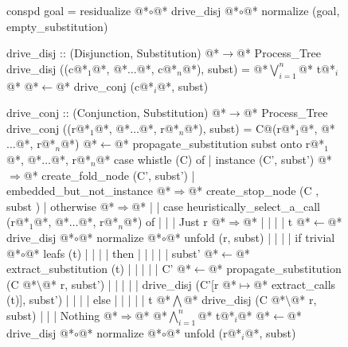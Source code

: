 \documentclass[12pt,a4paper]{report}
\begin{document}
\thispagestyle{empty}
\begin{figure}[h]
\begin{PseudoCode}[moredelim={[is][stringstyle]{@@}{@@}},
  moredelim={[is][\color{dkgreen}\bfseries]{@!}{@!}},
  moredelim={[is][\color{red}\bfseries]{!!}{!!}}]
conspd goal = residualize @*$\circ$@* drive_disj @*$\circ$@* normalize (goal, empty_substitution)

drive_disj :: (Disjunction, Substitution) @*$\to$@* Process_Tree
drive_disj ((c@*$_1$@*, @*$\dots$@*, c@*$_n$@*), subst) = @*$\bigvee_{i=1}^n$@* t@*$_i$@* @*$\leftarrow$@* drive_conj (c@*$_i$@*, subst)

drive_conj :: (Conjunction, Substitution) @*$\to$@* Process_Tree
drive_conj ((r@*$_1$@*, @*$\dots$@*, r@*$_n$@*), subst) =
  C@(r@*$_1$@*, @*$\dots$@*, r@*$_n$@*) @*$\leftarrow$@* propagate_substitution subst onto r@*$_1$@*, @*$\dots$@*, r@*$_n$@*
  case whistle (C) of
  | instance (C', subst')     @*$\Rightarrow$@* create_fold_node (C', subst')
  | embedded_but_not_instance @*$\Rightarrow$@* create_stop_node (C , subst )
  | otherwise @*$\Rightarrow$@*
  | | case heuristically_select_a_call (r@*$_1$@*, @*$\dots$@*, r@*$_n$@*) of
  | | | Just r @*$\Rightarrow$@*
  | | | | t @*$\leftarrow$@* drive_disj @*$\circ$@* normalize @*$\circ$@* unfold (r, subst)
  | | | | if trivial @*$\circ$@* leafs (t)
  | | | | then
  | | | | | subst' @*$\leftarrow$@* extract_substitution (t)
  | | | | | C' @*$\leftarrow$@* propagate_substitution (C @*$\setminus$@* r, subst')
  | | | | | drive_disj (C'[r @*$\mapsto$@* extract_calls (t)], subst')
  | | | | else
  | | | | | t @*$\bigwedge$@* drive_disj (C @*$\setminus$@* r, subst)
  | | | Nothing @*$\Rightarrow$@* @*$\bigwedge_{i=1}^n$@* t@*$_i$@* @*$\leftarrow$@* drive_disj @*$\circ$@* normalize @*$\circ$@* unfold (r@*$_i$@*, subst)
\end{PseudoCode}
\end{figure}
\end{document}
